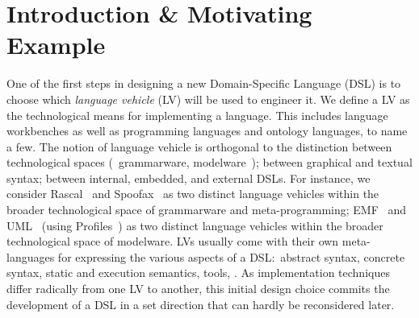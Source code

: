 \section{Introduction \& Motivating Example}
One of the first steps in designing a new Domain-Specific Language (DSL) is to choose which \emph{language vehicle} (LV) will be used to engineer it.
We define a LV as the technological means for implementing a language.
This includes language workbenches as well as programming languages and ontology languages, to name a few.
The notion of language vehicle is orthogonal to the distinction between technological spaces (\eg~grammarware, modelware~\cite{kurtev2002technological}); between graphical and textual syntax; between internal, embedded, and external DSLs.
For instance, we consider Rascal~\cite{klint2010easy} and Spoofax~\cite{kats2010spoofax} as two distinct language vehicles within the broader technological space of grammarware and meta-programming; EMF~\cite{steinberg2008emf} and UML~\cite{fowler2004uml} (using Profiles~\cite{selic2007systematic}) as two distinct language vehicles within the broader technological space of modelware.
LVs usually come with their own meta-languages for expressing the various aspects of a DSL:~abstract syntax, concrete syntax, static and execution semantics, tools, \etc.
As implementation techniques differ radically from one LV to another, this initial design choice commits the development of a DSL in a set direction that can hardly be reconsidered later.

